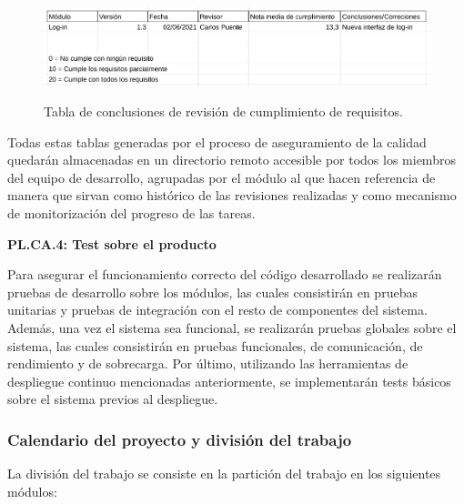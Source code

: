 \documentclass{article}
\begin{document}
\begin{figure}[H]
   \centering
       \includegraphics[height=3cm]{../images/tabla_conclusiones_revision_requisitos.png}
   \caption{Tabla de conclusiones de revisión de cumplimiento de requisitos.}
   \label{tablaConclusionesRequisitos}
\end{figure}
 
Todas estas tablas generadas por el proceso de aseguramiento de la calidad quedarán almacenadas en un directorio remoto accesible por todos los miembros del equipo de desarrollo, agrupadas por el módulo al que hacen referencia de manera que sirvan como histórico de las revisiones realizadas y como mecanismo de monitorización del progreso de las tareas.
 
\textbf{PL.CA.4: Test sobre el producto}
 
Para asegurar el funcionamiento correcto del código desarrollado se realizarán pruebas de desarrollo sobre los módulos, las cuales consistirán en pruebas unitarias y pruebas de integración con el resto de componentes del sistema. Además, una vez el sistema sea funcional, se realizarán pruebas globales sobre el sistema, las cuales consistirán en pruebas funcionales, de comunicación, de rendimiento y de sobrecarga. Por último, utilizando las herramientas de despliegue continuo mencionadas anteriormente, se implementarán tests básicos
sobre el sistema previos al despliegue.
 
\pagebreak
 
\subsubsection{Calendario del proyecto y división del trabajo} \label{GANTT}
 
La división del trabajo se consiste en la partición del trabajo en los siguientes módulos:
 
\end{document}
